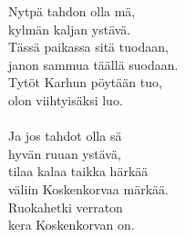 
Nytpä tahdon olla mä, \\ kylmän kaljan ystävä. \\ Tässä paikassa sitä tuodaan, \\ janon sammua täällä suodaan. \\ Tytöt Karhun pöytään tuo, \\ olon viihtyisäksi luo. \\ \hspace{10mm} \\ Ja jos tahdot olla sä \\ hyvän ruuan ystävä, \\ tilaa kalaa taikka härkää \\ väliin Koskenkorvaa märkää. \\ Ruokahetki verraton \\ kera Koskenkorvan on.